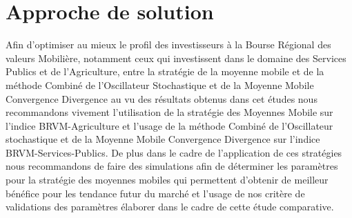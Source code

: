 \section{Approche de solution}
\par{
Afin d'optimiser au mieux le profil des investisseurs à la Bourse Régional des 
valeurs Mobilière, notamment ceux qui investissent dans le domaine des Services
Publics et de l'Agriculture, entre la stratégie de la 
moyenne mobile et de la méthode Combiné de l'Oscillateur Stochastique et de la 
Moyenne Mobile Convergence Divergence au vu des résultats obtenus dans cet études 
nous recommandons vivement l'utilisation de la stratégie des Moyennes Mobile 
sur l'indice BRVM-Agriculture et l'usage de la méthode Combiné de l'Oscillateur
    stochastique et de la Moyenne Mobile Convergence Divergence sur l'indice 
    BRVM-Services-Publics. De plus dans le cadre de l'application de ces stratégies
    nous recommandons de faire des simulations afin de déterminer les paramètres pour la stratégie des 
    moyennes mobiles qui permettent d'obtenir de meilleur bénéfice pour les tendance 
    futur du marché et l'usage de nos critère de validations des paramètres élaborer dans le 
    cadre de cette étude comparative. 
}




